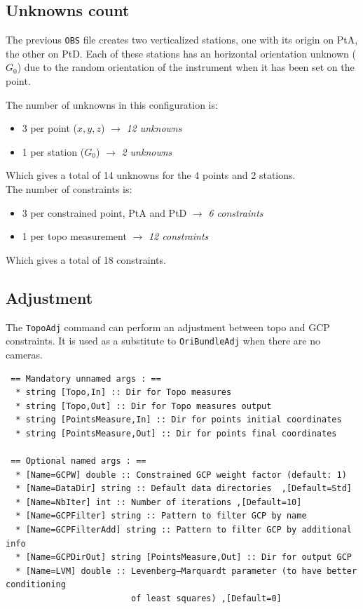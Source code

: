 \subsection{Unknowns count}

The previous \texttt{OBS} file creates two verticalized stations, one with its origin on PtA, the other on PtD.
Each of these stations has an horizontal orientation unknown ($G_0$) due to the random orientation of the instrument
when it has been set on the point.

The number of unknowns in this configuration is:
\begin{itemize}
   \item 3 per point ($x, y, z$)  $\rightarrow$ \textit{12 unknowns}
   \item 1 per station ($G_0$)  $\rightarrow$ \textit{2 unknowns}
\end{itemize}

Which gives a total of 14 unknowns for the 4 points and 2 stations.
\\

The number of constraints is:
\begin{itemize}
   \item 3 per constrained point, PtA and PtD  $\rightarrow$ \textit{6 constraints}
   \item 1 per topo measurement $\rightarrow$ \textit{12 constraints}
\end{itemize}

Which gives a total of 18 constraints.


\subsection{Adjustment}
\label{subsec:TopoAdj}
The \texttt{TopoAdj} command can perform an adjustment between topo and GCP constraints.
It is used as a substitute to \texttt{OriBundleAdj} when there are no cameras.

\begin{verbatim}
 == Mandatory unnamed args : ==
  * string [Topo,In] :: Dir for Topo measures
  * string [Topo,Out] :: Dir for Topo measures output
  * string [PointsMeasure,In] :: Dir for points initial coordinates
  * string [PointsMeasure,Out] :: Dir for points final coordinates

 == Optional named args : ==
  * [Name=GCPW] double :: Constrained GCP weight factor (default: 1)
  * [Name=DataDir] string :: Default data directories  ,[Default=Std]
  * [Name=NbIter] int :: Number of iterations ,[Default=10]
  * [Name=GCPFilter] string :: Pattern to filter GCP by name
  * [Name=GCPFilterAdd] string :: Pattern to filter GCP by additional info
  * [Name=GCPDirOut] string [PointsMeasure,Out] :: Dir for output GCP
  * [Name=LVM] double :: Levenberg–Marquardt parameter (to have better conditioning
                         of least squares) ,[Default=0]
\end{verbatim}

